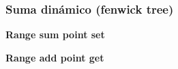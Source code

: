 \subsubsection{Suma dinámico (fenwick tree)}
    \textbf{Range sum point set}
    

    \textbf{Range add point get}
    
